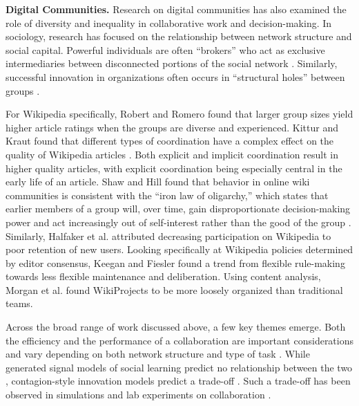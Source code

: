 \documentclass[letterpaper,twocolumn,10pt]{article}
\newcommand{\+}{\phantom{-}}
\begin{document}
{\bf Digital Communities.}
Research on digital communities has also examined the role of 
diversity and inequality
in collaborative work and decision-making.
In sociology, research has focused on the relationship between
network structure and social capital.
Powerful individuals are often ``brokers''
who act as exclusive intermediaries between disconnected portions of the
social network \cite{silverman_patronage_1965}.
Similarly, successful innovation in organizations often occurs in ``structural
holes'' between groups \cite{granovetter_strength_1973}.

For Wikipedia specifically,
Robert and Romero \citeyear{robert_crowd_2015} found that
larger group sizes yield higher article ratings
when the groups are diverse and experienced. Kittur and Kraut found that different types of coordination have a complex
effect on the quality of Wikipedia articles \citeyear{kittur_harnessing_2008}.
Both explicit and implicit coordination result in higher quality articles,
with explicit coordination being especially central in the early life of an
article.
Shaw and Hill \citeyear{shaw_laboratories_2014}
found that behavior in online wiki communities is consistent
with the ``iron law of oligarchy,''
which states that
earlier members of a group will, over time, gain disproportionate
decision-making power and act increasingly out of self-interest rather than
the good of the group \cite{michels_political_1999}.
Similarly, Halfaker et al. \citeyear{halfaker_rise_2013} attributed decreasing
participation on Wikipedia to poor retention of new users.
Looking specifically at Wikipedia policies determined by editor consensus,
Keegan and Fiesler \citeyear{keegan_evolution_2017} found a trend
from flexible rule-making towards less flexible maintenance and deliberation.
Using content analysis,
Morgan et al. \citeyear{morgan_project_2013} found WikiProjects to be
more loosely organized than traditional teams.

Across the broad range of work discussed above,
a few key themes emerge.
Both the efficiency and the performance of a collaboration are important
considerations and vary depending on both network structure and type of task
\cite{kearns_experiments_2012}.
While generated signal models of social learning predict no relationship
between the two
\cite{golub_naive_2010},
contagion-style innovation models predict a trade-off
\cite{mason_collaborative_2012,barkoczi_social_2016}.
Such a trade-off has been observed in simulations and lab experiments on
collaboration
\cite{kearns_experiments_2012,grim_scientific_2013}.
\end{document}
